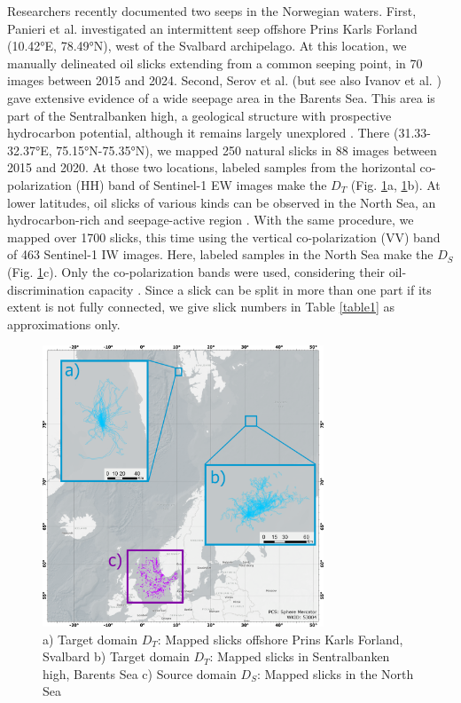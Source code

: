 \documentclass[lettersize,journal]{IEEEtran}
\begin{document}
Researchers recently documented two seeps in the Norwegian waters. First, Panieri et al. \cite{panieriArcticNaturalOil2024} investigated an intermittent seep offshore Prins Karls Forland 
(10.42°E, 78.49°N), west of the Svalbard archipelago. At this location, we manually delineated oil slicks extending from a common seeping point, in 70 images between 2015 and 2024.
Second, Serov et al. \cite{serovWidespreadNaturalMethane2023} (but see also Ivanov et al. \cite{ivanovSearchDetectionNatural2020}) gave extensive evidence of a wide seepage area in the Barents Sea. 
This area is part of the Sentralbanken high, a geological structure with prospective hydrocarbon potential, although it remains largely unexplored \cite{lundschienNorthBarentsComposite2025}. 
There (31.33-32.37°E, 75.15°N-75.35°N), we mapped 250 natural slicks in 88 images between 2015 and 2020.
At those two locations, labeled samples from the horizontal co-polarization (HH) band of Sentinel-1 EW images make the $\mathit{D}_T$ (Fig. \ref{figure1}a, \ref{figure1}b). 
At lower latitudes, oil slicks of various kinds can be observed in the North Sea, an hydrocarbon-rich and seepage-active region \cite{hovlandChapter2Focus1988}. 
With the same procedure, we mapped over 1700 slicks, this time using the vertical co-polarization (VV) band of 463 Sentinel-1 IW images. Here, labeled samples in the North Sea make the $\mathit{D}_S$ (Fig. \ref{figure1}c).
Only the co-polarization bands were used, considering their oil-discrimination capacity \cite{kudryavtsevDualCoPolarizedSAR2013,johanssonMultifrequencyPolarimetricSAR2017,brekkeSAROilSpill2020}.
Since a slick can be split in more than one part if its extent is not fully connected, we give slick numbers in Table \ref{table1} as approximations only.
\begin{figure}[!t]
    \centering
    \includegraphics[width=3.3in]{figures/layout2_grids.png} %
    \caption{a) Target domain \( \mathit{D}_T \): Mapped slicks offshore Prins Karls Forland, Svalbard \quad b) Target domain \( \mathit{D}_T \): Mapped slicks in Sentralbanken high, Barents Sea \quad 
    c) Source domain \( \mathit{D}_S \): Mapped slicks in the North Sea}
    \label{figure1}
\end{figure}
\end{document}
